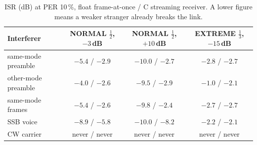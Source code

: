 \begin{table}[H]
    \centering
    \caption{ISR (dB) at PER 10\,\%, float frame-at-once / C streaming receiver.  A lower figure means a weaker stranger already breaks the link.}
    \label{tab:interference}
    \footnotesize
    \begin{tabular}{@{}lccc@{}}
    \toprule
    \textbf{Interferer} & \textbf{NORMAL $\frac12$, $-3$\,dB} & \textbf{NORMAL $\frac12$, $+10$\,dB} & \textbf{EXTREME $\frac13$, $-15$\,dB} \\
    \midrule
    same-mode preamble  & $-5.4$ / $-2.9$ & $-10.0$ / $-2.7$ & $-2.8$ / $-2.7$ \\
    other-mode preamble & $-4.0$ / $-2.6$ & $-9.5$ / $-2.9$ & $-1.0$ / $-2.1$ \\
    same-mode frames    & $-5.4$ / $-2.6$ & $-9.8$ / $-2.4$ & $-2.7$ / $-2.7$ \\
    SSB voice           & $-8.9$ / $-5.8$ & $-10.0$ / $-8.2$ & $-2.2$ / $-2.1$ \\
    CW carrier          & never / never & never / never & never / never \\
    \bottomrule
    \end{tabular}
\end{table}

